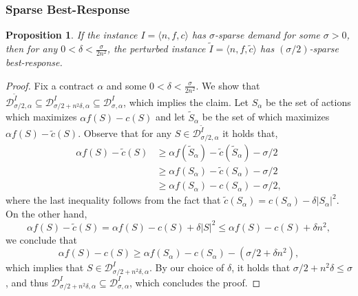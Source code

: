 \documentclass[11pt]{article}
\newtheorem{proposition}{Proposition}
\newcommand{\instanceI}{I=\langle n, f, c \rangle}
\newcommand{\inst}[3]{\langle #1, #2, #3 \rangle}
\newcommand{\demand}[2]{\mathcal{D}_{{#1},{#2}}}
\newcommand{\BR}[3]{\demand{#1}{#2}^{#3}}
\newcommand{\BRI}[2]{\BR{#1}{#2}{I}}
\newcommand{\tc}{\tilde{c}}
\newcommand{\tI}{\tilde{I}}
\newcommand{\InstTildeI}{\tI = \inst{n}{f}{\tc}}
\begin{document}
\subsubsection{Sparse Best-Response}
\begin{proposition}\label{prop:sparse_demand_submod_f_c}
    If the instance $\instanceI$ has $\sigma$-sparse demand for some $\sigma > 0$, then for any $0 < \delta < \frac{\sigma}{2n^2}$, the perturbed instance $\InstTildeI$ has $(\sigma/2)$-sparse best-response.
\end{proposition}
\begin{proof}
\newcommand{\sa}{S_\alpha}
\newcommand{\tsa}{\tilde{S}_\alpha}
Fix a contract $\alpha$ and some $0 < \delta < \frac{\sigma}{2n^2}$. We show that 
$\BR{\sigma/2}{\alpha}{\tI} \subseteq \BRI{\sigma/2+n^2\delta}{\alpha} \subseteq \BRI{\sigma}{\alpha}$, which implies the claim.
Let $\sa$ be the set of actions which maximizes $\alpha f(S) - c(S)$ and let $\tsa$ be the set of which maximizes $\alpha f(S) - \tc(S)$.
Observe that for any $S \in \BR{\sigma/2}{\alpha}{\tI}$
it holds that,
\begin{align*}
    \alpha f(S) - \tc(S) 
    &\ge \alpha f(\tsa) - \tc(\tsa) - \sigma/2 \\
    &\ge \alpha f(\sa) - \tc(\sa) - \sigma/2 \\
    &\ge \alpha f(\sa) - c(\sa) - \sigma/2,
\end{align*}
where the last inequality follows from the fact that $\tc(\sa) = c(\sa) - \delta|\sa|^2$.
On the other hand, 
$$\alpha f(S) - \tc(S) = \alpha f(S) - c(S) + \delta|S|^2 \le \alpha f(S) - c(S) + \delta n^2,$$ 
we conclude that 
\[
\alpha f(S) - c(S) \ge \alpha f(\sa) - c(\sa) - (\sigma/2 + \delta n^2),
\]
which implies that $S \in \BRI{\sigma/2+n^2\delta}{\alpha}$.
By our choice of $\delta$, it holds that $\sigma/2+n^2\delta \le \sigma$, and thus $\BRI{\sigma/2+n^2\delta}{\alpha} \subseteq \BRI{\sigma}{\alpha}$, which concludes the proof.
\end{proof}
\end{document}
